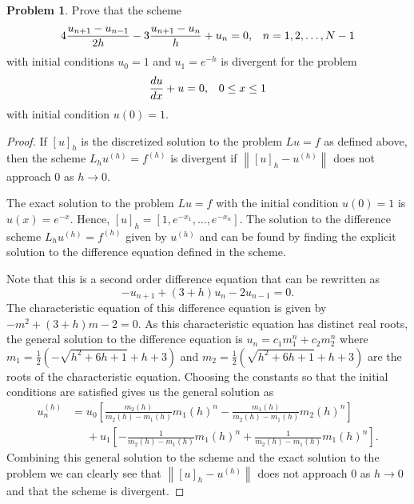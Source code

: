 \documentclass[12pt]{article}
\theoremstyle{definition}
\newtheorem{problem}{Problem}
\newcommand\norm[1]{\left\lVert#1\right\rVert}
\begin{document}
\begin{problem}
  Prove that the scheme
  \[
    4 \frac{u_{n+1} - u_{n-1}}{2h} - 3 \frac{u_{n+1} - u_n}{h} + u_n = 0\text{,\quad $n = 1, 2, \dots, N-1$}
  \]
  with initial conditions $u_0 = 1$ and $u_1 = e^{-h}$ is divergent for the problem
  \[
    \frac{du}{dx} + u = 0\text{,\quad $0 \leq x \leq 1$}
  \]
  with initial condition $u(0) = 1$.
\end{problem}

\begin{proof}
  If $[u]_h$ is the discretized solution to the problem $Lu = f$ as defined above,
  then the scheme $L_h u^{(h)} = f^{(h)}$ is divergent if $\norm{[u]_h - u^{(h)}}$
  does not approach 0 as $h \to 0$.

  The exact solution to the problem $Lu = f$ with the initial condition
  $u(0) = 1$ is $u(x) = e^{-x}$. Hence, $[u]_h = [1, e^{-x_1}, \dots, e^{-x_n}]$.
  The solution to the difference scheme $L_h u^{(h)} = f^{(h)}$ given by
  $u^{(h)}$ and can be found by finding the explicit solution to the difference
  equation defined in the scheme.

  Note that this is a second order difference equation that can be rewritten as
  \[
    - u_{n+1} + (3 + h) u_n - 2 u_{n-1} = 0.
  \]
  The characteristic equation of this difference equation is given by $-m^2 + (3+h)m -2 = 0$.
  As this characteristic equation has distinct real roots, the general
  solution to the difference equation is $u_n = c_1 m_1^n + c_2 m_2 ^n$ where
  $m_1 = \frac{1}{2}(-\sqrt{h^2 + 6h +1} + h + 3)$ and $m_2=\frac{1}{2}(\sqrt{h^2 + 6h +1} + h + 3)$
  are the roots of the characteristic equation. Choosing the constants so that
  the initial conditions are satisfied gives us the general solution as
  \begin{align*}
    u_n^{(h)} &= u_0 \left[\frac{m_2(h)}{m_2(h) - m_1(h)}m_1(h)^n - \frac{m_1(h)}{m_2(h) - m_1(h)}m_2(h)^n\right] \\
    &\phantom{= }+ u_1\left[-\frac{1}{m_2(h) - m_1(h)}m_1(h)^n + \frac{1}{m_2(h) - m_1(h)}m_1(h)^n\right].
  \end{align*}
  Combining this general solution to the scheme and the exact solution to the
  problem we can clearly see that $\norm{[u]_h - u^{(h)}}$ does not approach 0 as
  $h\to 0$ and that the scheme is divergent.
\end{proof}
\end{document}
